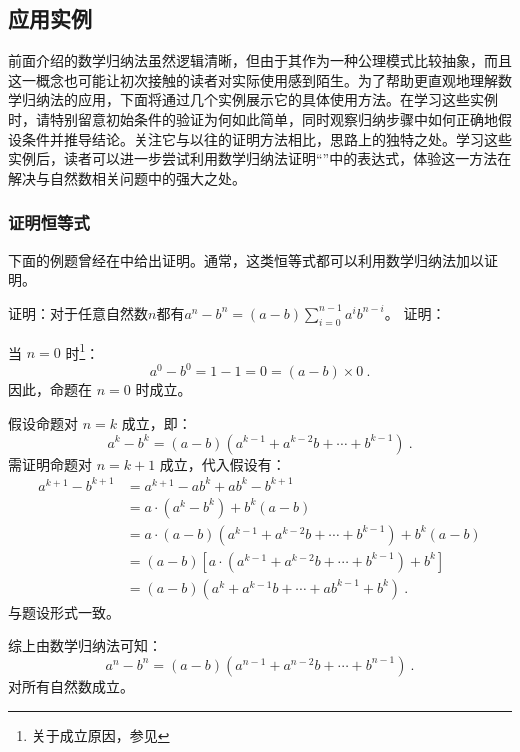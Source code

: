 \subsection{应用实例}

前面介绍的数学归纳法虽然逻辑清晰，但由于其作为一种公理模式比较抽象，而且这一概念也可能让初次接触的读者对实际使用感到陌生。为了帮助更直观地理解数学归纳法的应用，下面将通过几个实例展示它的具体使用方法。在学习这些实例时，请特别留意初始条件的验证为何如此简单，同时观察归纳步骤中如何正确地假设条件并推导结论。关注它与以往的证明方法相比，思路上的独特之处。学习这些实例后，读者可以进一步尝试利用数学归纳法证明“”中的表达式，体验这一方法在解决与自然数相关问题中的强大之处。

\subsubsection{证明恒等式}

下面的例题曾经在中给出证明。通常，这类恒等式都可以利用数学归纳法加以证明。

\begin{example}{证明：对于任意自然数$n$都有$\displaystyle a^{n}-b^{n}=\left(a-b\right)\sum_{i=0}^{n-1}a^{i}b^{n-i}$。}
证明：

当 $n = 0$ 时\footnote{关于成立原因，参见}：
\begin{equation}
a^0 - b^0 = 1-1=0=(a - b)\times0~.
\end{equation}
因此，命题在 $n = 0$ 时成立。

假设命题对 $n = k$ 成立，即：
\begin{equation}
a^k - b^k = (a - b)\left(a^{k-1} + a^{k-2}b + \cdots + b^{k-1}\right)~.
\end{equation}
需证明命题对 $n = k+1$ 成立，代入假设有：
\begin{equation}
\begin{aligned}
a^{k+1} - b^{k+1} &= a^{k+1}-ab^k+ab^k - b^{k+1}\\
&= a \cdot (a^k - b^k) + b^k(a - b)\\
&=a \cdot (a - b)\left(a^{k-1} + a^{k-2}b + \cdots + b^{k-1}\right) + b^k(a - b)\\
&=(a - b)\left[a \cdot \left(a^{k-1} + a^{k-2}b + \cdots + b^{k-1}\right) + b^k\right]\\
&=(a - b)\left(a^{k} + a^{k-1}b + \cdots + ab^{k-1} + b^k\right)~.
\end{aligned}
\end{equation}
与题设形式一致。

综上由数学归纳法可知：
\begin{equation}
a^n - b^n = (a - b)\left(a^{n-1} + a^{n-2}b + \cdots + b^{n-1}\right)~.
\end{equation}
对所有自然数成立。
\end{example}


